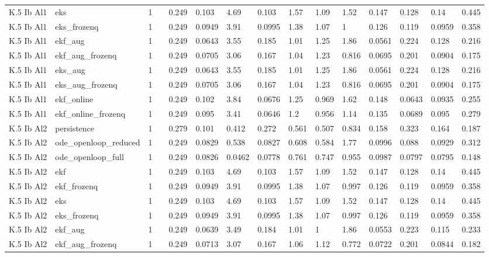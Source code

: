 \begin{table}[t]
\begin{tabular}{lllllllllllllll}
K.5 Ib Al1 & eks & 1 &  & 0.249 & 0.103 & 4.69 & 0.103 & 1.57 & 1.09 & 1.52 & 0.147 & 0.128 & 0.14 & 0.445 \\
K.5 Ib Al1 & eks\_frozenq & 1 &  & 0.249 & 0.0949 & 3.91 & 0.0995 & 1.38 & 1.07 & 1 & 0.126 & 0.119 & 0.0959 & 0.358 \\
K.5 Ib Al1 & ekf\_aug & 1 &  & 0.249 & 0.0643 & 3.55 & 0.185 & 1.01 & 1.25 & 1.86 & 0.0561 & 0.224 & 0.128 & 0.216 \\
K.5 Ib Al1 & ekf\_aug\_frozenq & 1 &  & 0.249 & 0.0705 & 3.06 & 0.167 & 1.04 & 1.23 & 0.816 & 0.0695 & 0.201 & 0.0904 & 0.175 \\
K.5 Ib Al1 & eks\_aug & 1 &  & 0.249 & 0.0643 & 3.55 & 0.185 & 1.01 & 1.25 & 1.86 & 0.0561 & 0.224 & 0.128 & 0.216 \\
K.5 Ib Al1 & eks\_aug\_frozenq & 1 &  & 0.249 & 0.0705 & 3.06 & 0.167 & 1.04 & 1.23 & 0.816 & 0.0695 & 0.201 & 0.0904 & 0.175 \\
K.5 Ib Al1 & ekf\_online & 1 &  & 0.249 & 0.102 & 3.84 & 0.0676 & 1.25 & 0.969 & 1.62 & 0.148 & 0.0643 & 0.0935 & 0.255 \\
K.5 Ib Al1 & ekf\_online\_frozenq & 1 &  & 0.249 & 0.095 & 3.41 & 0.0646 & 1.2 & 0.956 & 1.14 & 0.135 & 0.0689 & 0.095 & 0.279 \\
K.5 Ib Al2 & persistence & 1 &  & 0.279 & 0.101 & 0.412 & 0.272 & 0.561 & 0.507 & 0.834 & 0.158 & 0.323 & 0.164 & 0.187 \\
K.5 Ib Al2 & ode\_openloop\_reduced & 1 &  & 0.249 & 0.0829 & 0.538 & 0.0827 & 0.608 & 0.584 & 1.77 & 0.0996 & 0.088 & 0.0929 & 0.312 \\
K.5 Ib Al2 & ode\_openloop\_full & 1 &  & 0.249 & 0.0826 & 0.0462 & 0.0778 & 0.761 & 0.747 & 0.955 & 0.0987 & 0.0797 & 0.0795 & 0.148 \\
K.5 Ib Al2 & ekf & 1 &  & 0.249 & 0.103 & 4.69 & 0.103 & 1.57 & 1.09 & 1.52 & 0.147 & 0.128 & 0.14 & 0.445 \\
K.5 Ib Al2 & ekf\_frozenq & 1 &  & 0.249 & 0.0949 & 3.91 & 0.0995 & 1.38 & 1.07 & 0.997 & 0.126 & 0.119 & 0.0959 & 0.358 \\
K.5 Ib Al2 & eks & 1 &  & 0.249 & 0.103 & 4.69 & 0.103 & 1.57 & 1.09 & 1.52 & 0.147 & 0.128 & 0.14 & 0.445 \\
K.5 Ib Al2 & eks\_frozenq & 1 &  & 0.249 & 0.0949 & 3.91 & 0.0995 & 1.38 & 1.07 & 0.997 & 0.126 & 0.119 & 0.0959 & 0.358 \\
K.5 Ib Al2 & ekf\_aug & 1 &  & 0.249 & 0.0639 & 3.49 & 0.184 & 1.01 & 1 & 1.86 & 0.0553 & 0.223 & 0.115 & 0.233 \\
K.5 Ib Al2 & ekf\_aug\_frozenq & 1 &  & 0.249 & 0.0713 & 3.07 & 0.167 & 1.06 & 1.12 & 0.772 & 0.0722 & 0.201 & 0.0844 & 0.182 \\

\end{tabular}
\end{table}
